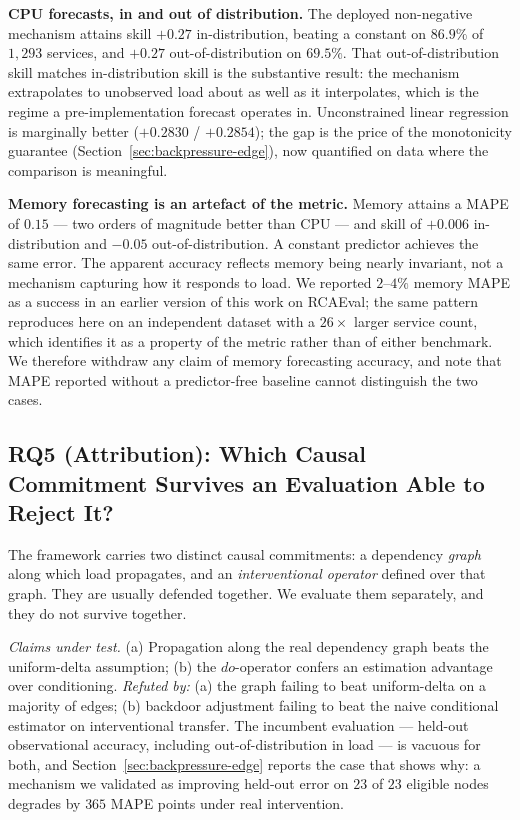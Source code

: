\documentclass[journal, 10pt]{IEEEtran}
\begin{document}
\textbf{CPU forecasts, in and out of distribution.} The deployed non-negative
mechanism attains skill $+0.27$ in-distribution, beating a constant on $86.9\%$
of $1{,}293$ services, and $+0.27$ out-of-distribution on $69.5\%$. That
out-of-distribution skill matches in-distribution skill is the substantive
result: the mechanism extrapolates to unobserved load about as well as it
interpolates, which is the regime a pre-implementation forecast operates in.
Unconstrained linear regression is marginally better ($+0.2830$ / $+0.2854$);
the gap is the price of the monotonicity guarantee (Section~\ref{sec:backpressure-edge}),
now quantified on data where the comparison is meaningful.

\textbf{Memory forecasting is an artefact of the metric.} Memory attains a MAPE
of $0.15$ --- two orders of magnitude better than CPU --- and skill of
$+0.006$ in-distribution and $-0.05$ out-of-distribution. A constant predictor
achieves the same error. The apparent accuracy reflects memory being nearly
invariant, not a mechanism capturing how it responds to load. We reported
$2$--$4\%$ memory MAPE as a success in an earlier version of this work on
RCAEval; the same pattern reproduces here on an independent dataset with a
$26{\times}$ larger service count, which identifies it as a property of the
metric rather than of either benchmark. We therefore withdraw any claim of
memory forecasting accuracy, and note that MAPE reported without a
predictor-free baseline cannot distinguish the two cases.


\subsection{RQ5 (Attribution): Which Causal Commitment Survives an Evaluation Able to Reject It?}
\label{sec:rq5}

The framework carries two distinct causal commitments: a dependency \emph{graph}
along which load propagates, and an \emph{interventional operator} defined over
that graph. They are usually defended together. We evaluate them separately, and
they do not survive together.

\emph{Claims under test.} (a) Propagation along the real dependency graph beats
the uniform-delta assumption; (b) the $do$-operator confers an estimation
advantage over conditioning. \emph{Refuted by:} (a) the graph failing to beat
uniform-delta on a majority of edges; (b) backdoor adjustment failing to beat the
naive conditional estimator on interventional transfer. The incumbent evaluation
--- held-out observational accuracy, including out-of-distribution in load --- is
vacuous for both, and Section~\ref{sec:backpressure-edge} reports the case that
shows why: a mechanism we validated as improving held-out error on $23$ of $23$
eligible nodes degrades by $365$ MAPE points under real intervention.
\end{document}
